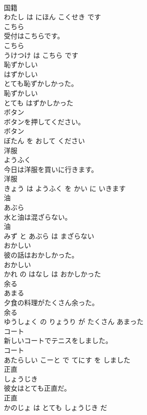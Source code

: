 \documentclass[8pt]{extreport}
\begin{document}
\begin{CJK}{UTF8}{min}
\\	国籍 
\\	わたし は にほん こくせき です			
\\	こちら	
\\	受付はこちらです。	
\\	こちら 
\\	うけつけ は こちら です			
\\	恥ずかしい	
\\	はずかしい			
\\	とても恥ずかしかった。	
\\	恥ずかしい 
\\	とても はずかしかった			
\\	ボタン	
\\	ボタンを押してください。	
\\	ボタン 
\\	ぼたん を おして ください			
\\	洋服	
\\	ようふく			
\\	今日は洋服を買いに行きます。	
\\	洋服 
\\	きょう は ようふく を かい に いきます			
\\	油	
\\	あぶら			
\\	水と油は混ざらない。	
\\	油 
\\	みず と あぶら は まざらない			
\\	おかしい	
\\	彼の話はおかしかった。	
\\	おかしい 
\\	かれ の はなし は おかしかった			
\\	余る	
\\	あまる			
\\	夕食の料理がたくさん余った。	
\\	余る 
\\	ゆうしょく の りょうり が たくさん あまった			
\\	コート	
\\	新しいコートでテニスをしました。	
\\	コート 
\\	あたらしい こーと で てにす を しました			
\\	正直	
\\	しょうじき			
\\	彼女はとても正直だ。	
\\	正直 
\\	かのじょ は とても しょうじき だ			

\end{CJK}
\end{document}
